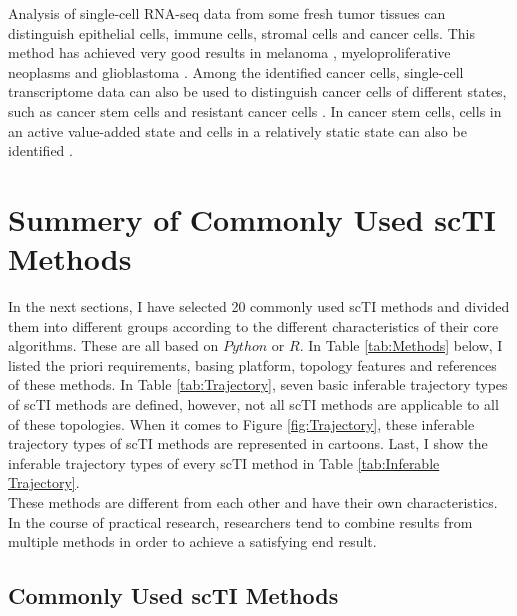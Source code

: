 Analysis of single-cell RNA-seq data from some fresh tumor tissues can distinguish epithelial cells, immune cells, stromal cells and cancer cells. This method has achieved very good results in melanoma \parencite{tirosh_dissecting_2016}, myeloproliferative neoplasms \parencite{kiselev_sc3:_2017} and glioblastoma \parencite{patel_single-cell_2014}. Among the identified cancer cells, single-cell transcriptome data can also be used to distinguish cancer cells of different states, such as cancer stem cells 
\parencite{patel_single-cell_2014,tirosh_single-cell_2016} and resistant cancer cells 
\parencite{tirosh_dissecting_2016}. In cancer stem cells, cells in an active value-added state and cells in a relatively static state can also be identified 
\parencite{patel_single-cell_2014,tirosh_dissecting_2016,tirosh_single-cell_2016}. 

\section{Summery of Commonly Used scTI Methods}

In the next sections, I have selected 20 commonly used scTI methods and divided them into different groups according to the different characteristics of their core algorithms. These are all based on $Python$ or $R$. In Table \ref{tab:Methods} below, I listed the priori requirements, basing platform, topology features and references of these methods. In Table \ref{tab:Trajectory}, seven basic inferable trajectory types of scTI methods are defined, however, not all scTI methods are applicable to all of these topologies. When it comes to Figure \ref{fig:Trajectory}, these inferable trajectory types of scTI methods are represented in cartoons. Last, I show the inferable trajectory types of every scTI method in Table \ref{tab:Inferable Trajectory}. \\

These methods are different from each other and have their own characteristics. In the course of practical research, researchers tend to combine results from multiple methods in order to achieve a satisfying end result.

\subsection{Commonly Used scTI Methods}


